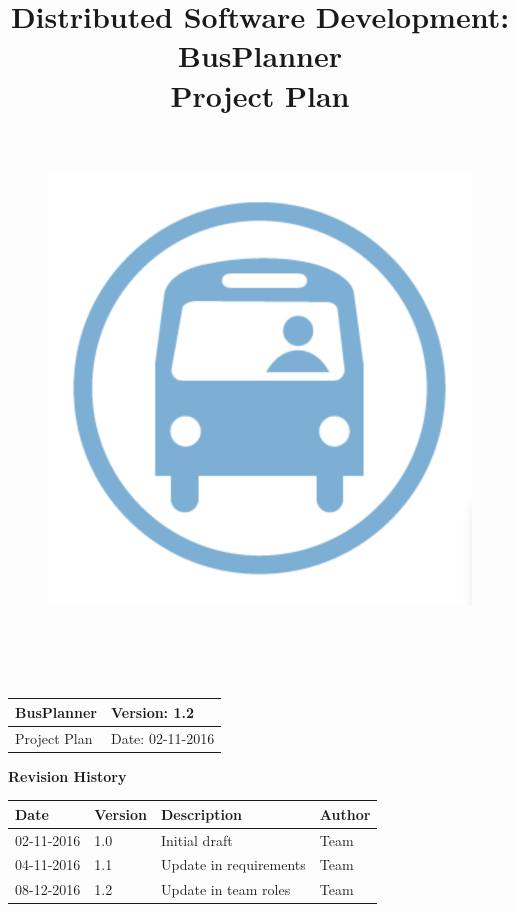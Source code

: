 \documentclass[a4paper, 12pt]{article}
\title{
	\textbf{D}istributed \textbf{S}oftware \textbf{D}evelopment: \textbf{BusPlanner}\\
	\textbf{Project Plan}\\
	\begin{figure}[H]
		\centering
		\includegraphics[width=13cm, height=13cm]{Bus_logo}
	\end{figure}
\date{}
}
\begin{document}
	\begin{table}[t]
		\centering
		\begin{tabular}{| m{6cm} | m{6cm} |}
			\hline
			BusPlanner & Version: 1.2\\
			\hline
			Project Plan & Date: 02-11-2016\\
			\hline
		\end{tabular}
	\end{table}
	\maketitle
	\begin{center}
		\textbf{\Large Revision History}
	\end{center}
	\begin{table}[h]
		\centering
		\begin{tabular}{| m{2cm} | m{2cm} | m{6cm} | m{2cm} |}
			\hline
			\textbf{Date} & \textbf{Version} & \textbf{Description} & \textbf{Author}\\
			\hline
			02-11-2016 & 1.0 & Initial draft & Team\\
			\hline
			04-11-2016 & 1.1 & Update in requirements & Team\\
			\hline
			08-12-2016 & 1.2 & Update in team roles & Team\\
			\hline
		\end{tabular}
	\end{table}
\newpage
	\tableofcontents
	
	
	
	
	
	
	
\end{document}
